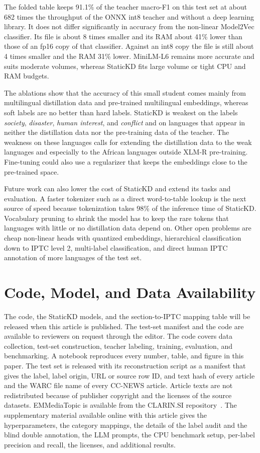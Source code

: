 \documentclass{ieeeaccess}
\begin{document}
The folded table keeps 91.1\% of the teacher macro-F1 on this test set at about 682 times the throughput of the ONNX int8 teacher and without a deep learning library. It does not differ significantly in accuracy from the non-linear Model2Vec classifier. Its file is about 8 times smaller and its RAM about 41\% lower than those of an fp16 copy of that classifier. Against an int8 copy the file is still about 4 times smaller and the RAM 31\% lower. MiniLM-L6 remains more accurate and suits moderate volumes, whereas StaticKD fits large volume or tight CPU and RAM budgets.

The ablations show that the accuracy of this small student comes mainly from multilingual distillation data and pre-trained multilingual embeddings, whereas soft labels are no better than hard labels. StaticKD is weakest on the labels \emph{society}, \emph{disaster}, \emph{human interest}, and \emph{conflict} and on languages that appear in neither the distillation data nor the pre-training data of the teacher. The weakness on these languages calls for extending the distillation data to the weak languages and especially to the African languages outside XLM-R pre-training. Fine-tuning could also use a regularizer that keeps the embeddings close to the pre-trained space.

Future work can also lower the cost of StaticKD and extend its tasks and evaluation. A faster tokenizer such as a direct word-to-table lookup is the next source of speed because tokenization takes 98\% of the inference time of StaticKD. Vocabulary pruning to shrink the model has to keep the rare tokens that languages with little or no distillation data depend on. Other open problems are cheap non-linear heads with quantized embeddings, hierarchical classification down to IPTC level 2, multi-label classification, and direct human IPTC annotation of more languages of the test set.

\section*{Code, Model, and Data Availability}
The code, the StaticKD models, and the section-to-IPTC mapping table will be released when this article is published. The test-set manifest and the code are available to reviewers on request through the editor. The code covers data collection, test-set construction, teacher labeling, training, evaluation, and benchmarking. A notebook reproduces every number, table, and figure in this paper. The test set is released with its reconstruction script as a manifest that gives the label, label origin, URL or source row ID, and text hash of every article and the WARC file name of every CC-NEWS article. Article texts are not redistributed because of publisher copyright and the licenses of the source datasets. EMMediaTopic is available from the CLARIN.SI repository~\cite{emmediatopic2025}. The supplementary material available online with this article gives the hyperparameters, the category mappings, the details of the label audit and the blind double annotation, the LLM prompts, the CPU benchmark setup, per-label precision and recall, the licenses, and additional results.
\end{document}
